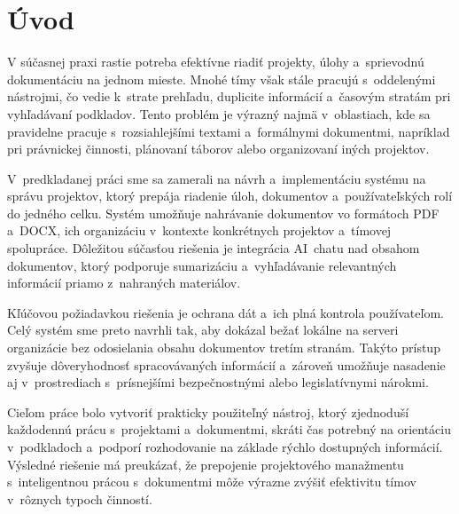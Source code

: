 \chapter*{Úvod}

        V súčasnej praxi rastie potreba efektívne riadiť projekty, úlohy a~sprievodnú
dokumentáciu na jednom mieste. Mnohé tímy však stále pracujú s~oddelenými nástrojmi, čo
vedie k~strate prehľadu, duplicite informácií a~časovým stratám pri vyhľadávaní podkladov.
Tento problém je výrazný najmä v~oblastiach, kde sa pravidelne pracuje s~rozsiahlejšími
textami a~formálnymi dokumentmi, napríklad pri právnickej činnosti, plánovaní táborov
alebo organizovaní iných projektov.

        V~predkladanej práci sme sa zamerali na návrh a~implementáciu systému na správu projektov,
ktorý prepája riadenie úloh, dokumentov a~používateľských rolí do jedného celku.
Systém umožňuje nahrávanie dokumentov vo formátoch PDF a~DOCX, ich organizáciu v~kontexte
konkrétnych projektov a~tímovej spolupráce. Dôležitou súčasťou riešenia je integrácia
AI~chatu nad obsahom dokumentov, ktorý podporuje sumarizáciu a~vyhľadávanie relevantných
informácií priamo z~nahraných materiálov.

        Kľúčovou požiadavkou riešenia je ochrana dát a~ich plná kontrola používateľom.
Celý systém sme preto navrhli tak, aby dokázal bežať lokálne na serveri organizácie
bez odosielania obsahu dokumentov tretím stranám. Takýto prístup zvyšuje dôveryhodnosť
spracovávaných informácií a~zároveň umožňuje nasadenie aj v~prostrediach s~prísnejšími
bezpečnostnými alebo legislatívnymi nárokmi.

        Cieľom práce bolo vytvoriť prakticky použiteľný nástroj, ktorý zjednoduší každodennú
prácu s~projektami a~dokumentmi, skráti čas potrebný na orientáciu v~podkladoch
a~podporí rozhodovanie na základe rýchlo dostupných informácií. Výsledné riešenie má
preukázať, že prepojenie projektového manažmentu s~inteligentnou prácou s~dokumentmi
môže výrazne zvýšiť efektivitu tímov v~rôznych typoch činností.
